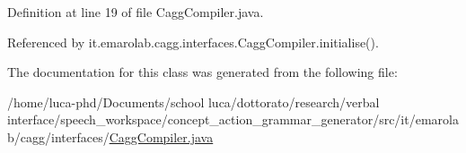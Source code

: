 Definition at line 19 of file Cagg\-Compiler.\-java.



Referenced by it.\-emarolab.\-cagg.\-interfaces.\-Cagg\-Compiler.\-initialise().



The documentation for this class was generated from the following file\-:\begin{DoxyCompactItemize}
\item 
/home/luca-\/phd/\-Documents/school luca/dottorato/research/verbal interface/speech\-\_\-workspace/concept\-\_\-action\-\_\-grammar\-\_\-generator/src/it/emarolab/cagg/interfaces/\hyperlink{CaggCompiler_8java}{Cagg\-Compiler.\-java}\end{DoxyCompactItemize}
